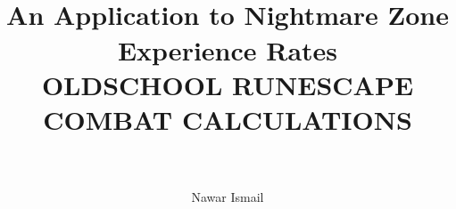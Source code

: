 \documentclass[12pt,a4paper]{article}
\author{Nawar Ismail}
\title{
	\HRule{0.5pt}\\
	An Application to Nightmare Zone Experience Rates\\
	\LARGE \textbf{\uppercase{Oldschool Runescape Combat Calculations}}\\
	\HRule{2pt}\\
}
\begin{document}
\begin{titlepage}
	\maketitle
\end{titlepage}
\end{document}
